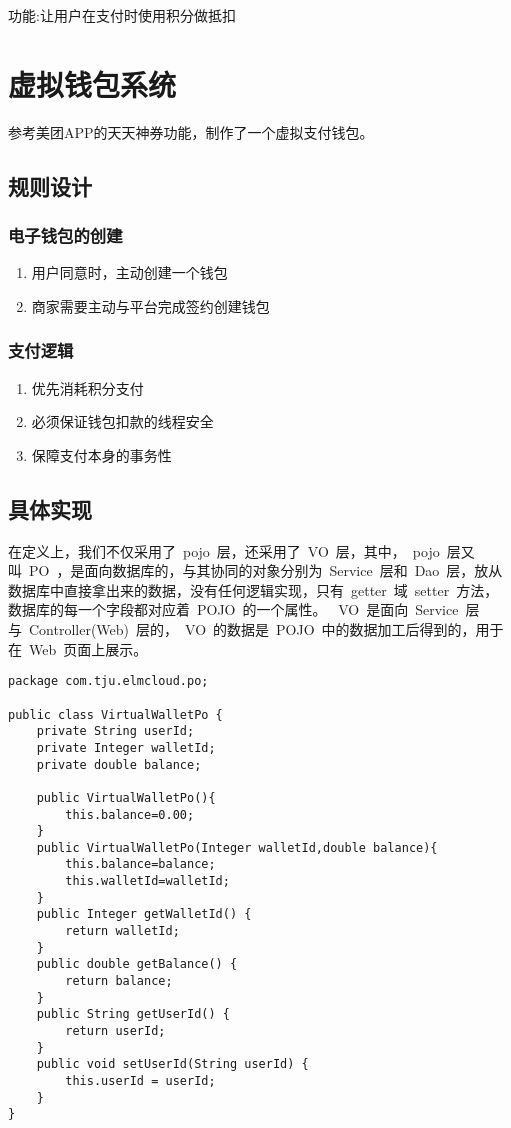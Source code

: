 功能:让用户在支付时使用积分做抵扣

\section{虚拟钱包系统}
参考美团APP的天天神券功能，制作了一个虚拟支付钱包。

\subsection{规则设计}
\subsubsection{电子钱包的创建}
\begin{enumerate}
	\item 用户同意时，主动创建一个钱包
	\item 商家需要主动与平台完成签约创建钱包
\end{enumerate}

\subsubsection{支付逻辑}
\begin{enumerate}
	\item 优先消耗积分支付
	\item 必须保证钱包扣款的线程安全
	\item 保障支付本身的事务性
\end{enumerate}

\subsection{具体实现}
在定义上，我们不仅采用了~pojo~层，还采用了~VO~层，其中，~pojo~层又叫~PO~，是面向数据库的，与其协同的对象分别为~Service~层和~Dao~层，放从数据库中直接拿出来的数据，没有任何逻辑实现，只有~getter~域~setter~方法，数据库的每一个字段都对应着~POJO~的一个属性。
~VO~是面向~Service~层与~Controller(Web)~层的，~VO~的数据是~POJO~中的数据加工后得到的，用于在~Web~页面上展示。

\begin{lstlisting}[basicstyle=\footnotesize]
package com.tju.elmcloud.po;

public class VirtualWalletPo {
	private String userId;
	private Integer walletId;
	private double balance;

	public VirtualWalletPo(){
		this.balance=0.00;
	}
	public VirtualWalletPo(Integer walletId,double balance){
		this.balance=balance;
		this.walletId=walletId;
	}
	public Integer getWalletId() {
		return walletId;
	}
	public double getBalance() {
		return balance;
	}
	public String getUserId() {
		return userId;
	}
	public void setUserId(String userId) {
		this.userId = userId;
	}
}	
\end{lstlisting}
		
